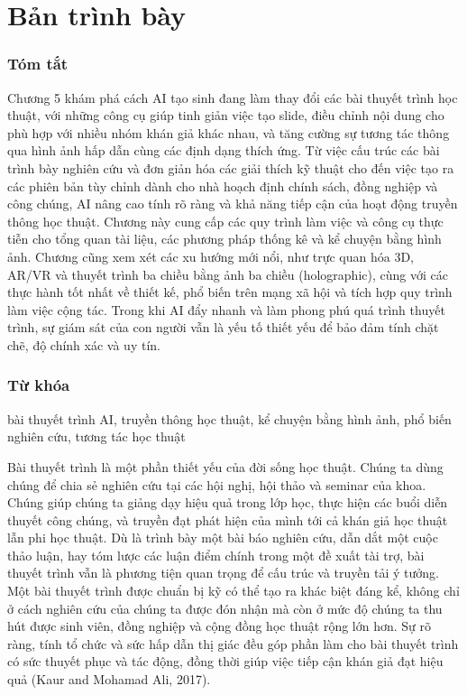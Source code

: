\chapter{Bản trình bày}

\subsection{Tóm tắt}

Chương 5 khám phá cách AI tạo sinh đang làm thay đổi các bài thuyết trình học thuật, với những công cụ giúp tinh giản việc tạo slide, điều chỉnh nội dung cho phù hợp với nhiều nhóm khán giả khác nhau, và tăng cường sự tương tác thông qua hình ảnh hấp dẫn cùng các định dạng thích ứng. Từ việc cấu trúc các bài trình bày nghiên cứu và đơn giản hóa các giải thích kỹ thuật cho đến việc tạo ra các phiên bản tùy chỉnh dành cho nhà hoạch định chính sách, đồng nghiệp và công chúng, AI nâng cao tính rõ ràng và khả năng tiếp cận của hoạt động truyền thông học thuật. Chương này cung cấp các quy trình làm việc và công cụ thực tiễn cho tổng quan tài liệu, các phương pháp thống kê và kể chuyện bằng hình ảnh. Chương cũng xem xét các xu hướng mới nổi, như trực quan hóa 3D, AR/VR và thuyết trình ba chiều bằng ảnh ba chiều (holographic), cùng với các thực hành tốt nhất về thiết kế, phổ biến trên mạng xã hội và tích hợp quy trình làm việc cộng tác. Trong khi AI đẩy nhanh và làm phong phú quá trình thuyết trình, sự giám sát của con người vẫn là yếu tố thiết yếu để bảo đảm tính chặt chẽ, độ chính xác và uy tín.

\subsection{Từ khóa}

bài thuyết trình AI, truyền thông học thuật, kể chuyện bằng hình ảnh, phổ biến nghiên cứu, tương tác học thuật

Bài thuyết trình là một phần thiết yếu của đời sống học thuật. Chúng ta dùng chúng để chia sẻ nghiên cứu tại các hội nghị, hội thảo và seminar của khoa. Chúng giúp chúng ta giảng dạy hiệu quả trong lớp học, thực hiện các buổi diễn thuyết công chúng, và truyền đạt phát hiện của mình tới cả khán giả học thuật lẫn phi học thuật. Dù là trình bày một bài báo nghiên cứu, dẫn dắt một cuộc thảo luận, hay tóm lược các luận điểm chính trong một đề xuất tài trợ, bài thuyết trình vẫn là phương tiện quan trọng để cấu trúc và truyền tải ý tưởng. Một bài thuyết trình được chuẩn bị kỹ có thể tạo ra khác biệt đáng kể, không chỉ ở cách nghiên cứu của chúng ta được đón nhận mà còn ở mức độ chúng ta thu hút được sinh viên, đồng nghiệp và cộng đồng học thuật rộng lớn hơn. Sự rõ ràng, tính tổ chức và sức hấp dẫn thị giác đều góp phần làm cho bài thuyết trình có sức thuyết phục và tác động, đồng thời giúp việc tiếp cận khán giả đạt hiệu quả (Kaur and Mohamad Ali, 2017).

